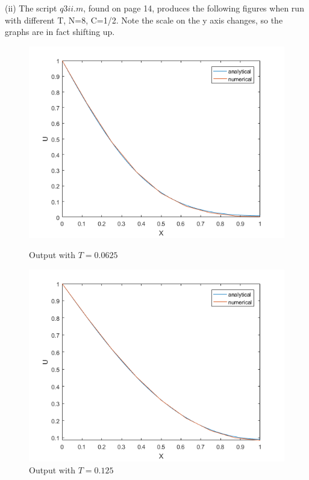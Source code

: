 \documentclass[10pt,a4paper]{report}
\begin{document}
(ii) The script $q3ii.m$, found on page 14, produces the following figures when run with different T, N=8, C=1/2. Note the scale on the y axis changes, so the graphs are in fact shifting up.

\newpage

\begin{figure}[ht]
\begin{minipage}[b]{0.5\linewidth}
\centering
\includegraphics[width=\textwidth]{3ii00625}
\caption{Output with $T=0.0625$}
\end{minipage}
\hspace{0.5cm}
\begin{minipage}[b]{0.5\linewidth}
\centering
\includegraphics[width=\textwidth]{3ii0125}
\caption{Output with $T=0.125$}
\end{minipage}
\end{figure}
\end{document}
